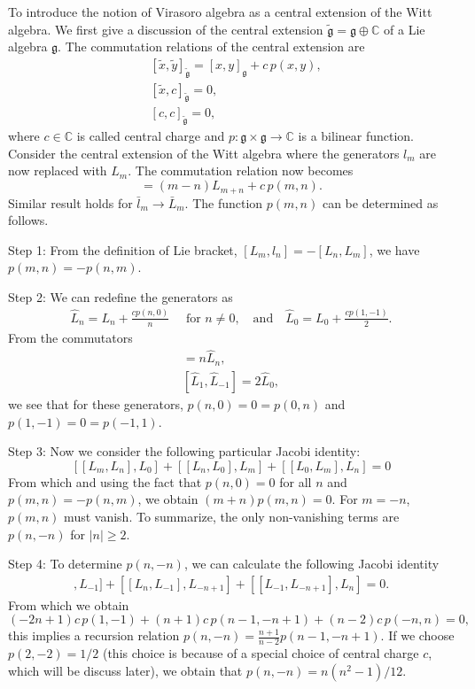 \documentclass[graybox,envcountchap,sectrefs]{svmono}
\begin{document}
To introduce the notion of Virasoro algebra as a central extension of the Witt algebra. We first give a discussion of the central extension $\tilde{\mathfrak{g}}=\mathfrak{g}\oplus \mathbb{C}$ of a Lie algebra $\mathfrak{g}$. The commutation relations of the central extension are
\begin{align}
&[\tilde{x},\tilde{y}]_{\tilde{\mathfrak{g}}}=[x,y]_{\mathfrak{g}}+c\,p(x,y),\\
&[\tilde{x},c]_{\tilde{\mathfrak{g}}}=0,\\
&[c,c]_{\tilde{\mathfrak{g}}}=0,
\end{align}
where $c\in \mathbb{C}$ is called central charge and $p:\mathfrak{g}\times \mathfrak{g}\to \mathbb{C}$ is a bilinear function.
Consider the central extension of the Witt algebra
where the generators $l_m$ are now replaced with $L_m$. The commutation relation now becomes
\begin{equation}
[L_m,L_n]=(m-n)L_{m+n}+c\,p(m,n).	
\end{equation}
Similar result holds for $\bar{l}_m\to \bar{L}_m$.
The function $p(m,n)$ can be determined as follows.

Step 1: From the definition of Lie bracket, $[L_m,l_n]=-[L_n,L_m]$, we have $p(m,n)=-p(n,m)$.

Step 2: We can redefine the generators as
\begin{align}
\widehat{L}_{n}=L_{n}+\frac{c p(n, 0)}{n} \quad \text{ for }
n \neq 0, \quad \text{and}\quad \widehat{L}_{0}=L_{0}+\frac{c p(1,-1)}{2}.
\end{align}
From the commutators 
\begin{align}
	[\widehat{L}_n,\widehat{L}_0]=n\widehat{L}_n,\\
	[\widehat{L}_{1},\widehat{L}_{-1}]=2\widehat{L}_0,
\end{align}
we see that for these generators, $p(n,0)=0=p(0,n)$ and $p(1,-1)=0=p(-1,1)$.

Step 3: Now we consider the following particular Jacobi identity:
\begin{equation}
\left[\left[L_{m}, L_{n}\right], L_{0}\right]+\left[\left[L_{n}, L_{0}\right], L_{m}\right]+\left[\left[L_{0}, L_{m}\right], L_{n}\right]=0
\end{equation}
From which and using the fact that $p(n,0)=0$ for all $n$ and $p(m,n)=-p(n,m)$, we obtain $(m+n)p(m,n)=0$.
For $m=-n$, $p(m,n)$ must vanish. To summarize, the only non-vanishing terms are $p(n,-n)$ for $|n|\geq 2$.

Step 4: To determine $p(n,-n)$, we can calculate the following Jacobi identity
\begin{align}
[[L_{-n+1},L_n],L_{-1}]+[[L_n,L_{-1}],L_{-n+1}]+[[L_{-1},L_{-n+1}],L_{n}]=0.	
\end{align}
From which we obtain 
\begin{equation}
(-2n+1)c\,p(1,-1)+(n+1)c\, p(n-1,-n+1)+(n-2)c\,p(-n,n)=0,
\end{equation}
this implies a recursion relation $p(n,-n)=\frac{n+1}{n-2}p(n-1,-n+1)$. If we choose $p(2,-2)=1/2$ (this choice is because of a special choice of central charge $c$, which will be discuss later), we obtain that $p(n,-n)=n(n^2-1)/12$.
\end{document}
